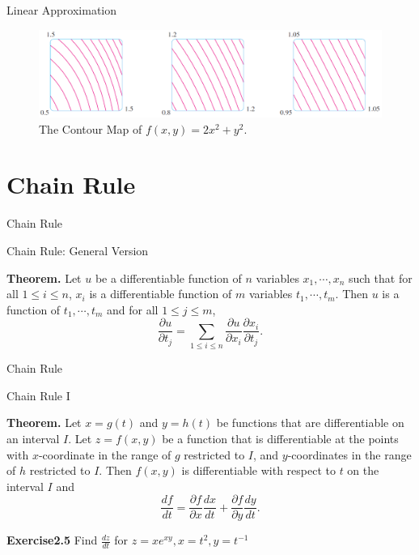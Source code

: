 \documentclass{beamer}
\begin{document}
    \begin{frame}{Linear Approximation}
        \begin{figure}
            \includegraphics[width = 13cm]{f14}
            \caption{The Contour Map of $f(x,y) = 2x^2 + y^2$.}
        \end{figure}
    \end{frame}

\section{Chain Rule}
    \begin{frame}[label=7]{Chain Rule}
        \begin{block}{Chain Rule: General Version}
            \par \textbf{Theorem.} Let $u$ be a differentiable function of $n$ variables $x_1, \cdots, x_n$ such that for all $1 \leq i \leq n$, $x_i$ is a differentiable function of $m$ variables $t_1, \cdots, t_m$. Then $u$ is a function of $t_1, \cdots, t_m$ and for all $1 \leq j \leq m$, 
            \begin{equation*}
                \dfrac{\partial u}{\partial t_j} = \sum\limits_{1 \leq i \leq n} \dfrac{\partial u}{\partial x_i} \dfrac{\partial x_i}{\partial t_j}.
            \end{equation*}
        \end{block}
    \end{frame}

    \begin{frame}[t]{Chain Rule}
        \begin{block}{Chain Rule I}
            \par \textbf{Theorem.} Let $x = g(t)$ and $y = h(t)$ be functions that are differentiable on an interval $I$. Let $z = f(x,y)$ be a function that is differentiable at the points with $x$-coordinate in the range of $g$ restricted to $I$, and $y$-coordinates in the range of $h$ restricted to $I$. Then $f(x,y)$ is differentiable with respect to $t$ on the interval $I$ and 
            \begin{equation*}
                \dfrac{df}{dt} = \dfrac{\partial f}{\partial x} \dfrac{dx}{dt} + \dfrac{\partial f}{\partial y} \dfrac{dy}{dt} .
            \end{equation*}
        \end{block}
        \par \textbf{Exercise2.5} Find $\frac{dz}{dt}$ for $z = xe^{xy}, x = t^2, y = t^{-1}$
    \end{frame}
\end{document}
